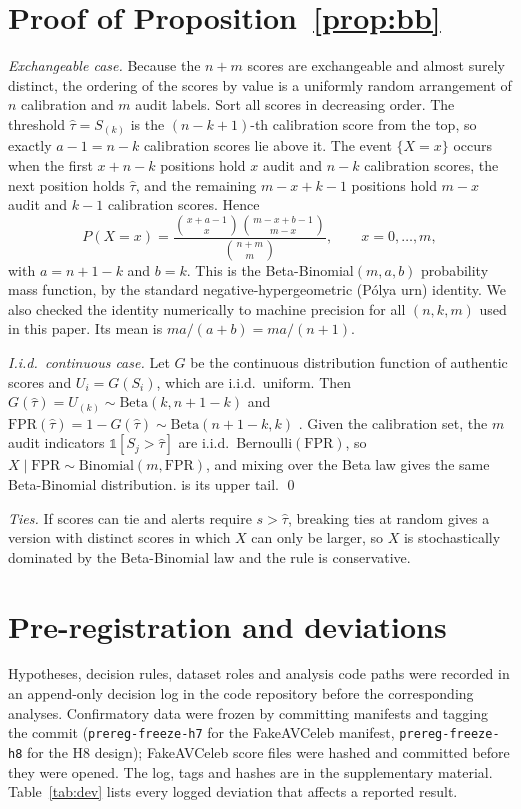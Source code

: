 \section{Proof of Proposition~\ref{prop:bb}}
\label{app:proof}

\emph{Exchangeable case.} Because the $n+m$ scores are exchangeable and almost surely distinct, the ordering of the scores by value is a uniformly random arrangement of $n$ calibration and $m$ audit labels. Sort all scores in decreasing order. The threshold $\hat\tau=S_{(k)}$ is the $(n-k+1)$-th calibration score from the top, so exactly $a-1=n-k$ calibration scores lie above it. The event $\{X=x\}$ occurs when the first $x+n-k$ positions hold $x$ audit and $n-k$ calibration scores, the next position holds $\hat\tau$, and the remaining $m-x+k-1$ positions hold $m-x$ audit and $k-1$ calibration scores. Hence
\[
P(X=x)=\frac{\binom{x+a-1}{x}\binom{m-x+b-1}{m-x}}{\binom{n+m}{m}},\qquad x=0,\dots,m,
\]
with $a=n+1-k$ and $b=k$. This is the Beta-Binomial$(m,a,b)$ probability mass function, by the standard negative-hypergeometric (P\'olya urn) identity. We also checked the identity numerically to machine precision for all $(n,k,m)$ used in this paper. Its mean is $ma/(a+b)=ma/(n+1)$.

\emph{I.i.d.\ continuous case.} Let $G$ be the continuous distribution function of authentic scores and $U_i=G(S_i)$, which are i.i.d.\ uniform. Then $G(\hat\tau)=U_{(k)}\sim\mathrm{Beta}(k,n+1-k)$ and $\mathrm{FPR}(\hat\tau)=1-G(\hat\tau)\sim\mathrm{Beta}(n+1-k,k)$ \citep{vovk2012conditional}. Given the calibration set, the $m$ audit indicators $\mathbb{1}[S_j>\hat\tau]$ are i.i.d.\ Bernoulli$(\mathrm{FPR})$, so $X\mid\mathrm{FPR}\sim\mathrm{Binomial}(m,\mathrm{FPR})$, and mixing over the Beta law gives the same Beta-Binomial distribution.  is its upper tail. \qed

\emph{Ties.} If scores can tie and alerts require $s>\hat\tau$, breaking ties at random gives a version with distinct scores in which $X$ can only be larger, so $X$ is stochastically dominated by the Beta-Binomial law and the rule is conservative.

\section{Pre-registration and deviations}
\label{app:prereg}

Hypotheses, decision rules, dataset roles and analysis code paths were recorded in an append-only decision log in the code repository before the corresponding analyses. Confirmatory data were frozen by committing manifests and tagging the commit (\texttt{prereg-freeze-h7} for the FakeAVCeleb manifest, \texttt{prereg-freeze-h8} for the H8 design); FakeAVCeleb score files were hashed and committed before they were opened. The log, tags and hashes are in the supplementary material. Table~\ref{tab:dev} lists every logged deviation that affects a reported result.

